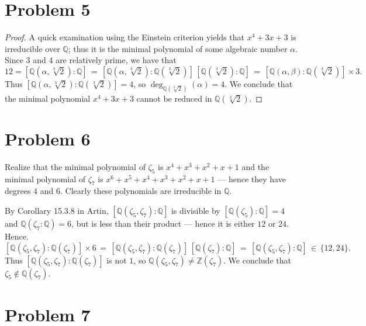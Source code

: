 \documentclass[11pt]{article}
\begin{document}
\section{Problem 5}

\begin{proof}
  A quick examination using the Einstein criterion yields that $x^{4} + 3x + 3$ is irreducible over $\mathbb{Q}$; thus it is the minimal polynomial of some algebraic number $\alpha$. Since $3$ and $4$ are relatively prime, we have that
  \[
    12 = [\mathbb{Q}(\alpha, \sqrt[3]{2}) : \mathbb{Q}] \, = \, [\mathbb{Q}(\alpha, \sqrt[3]{2}) : \mathbb{Q}(\sqrt[3]{2})] \, [\mathbb{Q}(\sqrt[3]{2}) : \mathbb{Q}] \, = \, [\mathbb{Q}(\alpha, \beta) : \mathbb{Q}(\sqrt[3]{2})] \times 3.
  \]
  Thus $[\mathbb{Q}(\alpha, \sqrt[3]{2}) : \mathbb{Q}(\sqrt[3]{2})] = 4$, so $\deg_{\mathbb{Q}(\sqrt[3]{2})} (\alpha) = 4$. We conclude that the minimal polynomial $x^{4} + 3x + 3$ cannot be reduced in $\mathbb{Q}(\sqrt[3]{2})$.
\end{proof}



\section{Problem 6}

Realize that the minimal polynomial of $\zeta_{5}$ is $x^{4} + x^{3} + x^{2} + x + 1$ and the minimal polynomial of $\zeta_{7}$ is $x^{6} + x^{5} + x^{4} + x^{3} + x^{2} + x + 1$ --- hence they have degrees $4$ and $6$. Clearly these polynomials are irreducible in $\mathbb{Q}$.

By Corollary 15.3.8 in Artin, $[\mathbb{Q}(\zeta_{5}, \zeta_{7}) : \mathbb{Q}]$ is divisible by $[\mathbb{Q}(\zeta_{5}) : \mathbb{Q}] = 4$ and $\mathbb{Q}(\zeta_{7} : \mathbb{Q}) = 6$, but is less than their product --- hence it is either $12$ or $24$. Hence.
\[
  [\mathbb{Q}(\zeta_{5}, \zeta_{7}) : \mathbb{Q}(\zeta_{7})] \times 6 \, = \, [\mathbb{Q}(\zeta_{5}, \zeta_{7}) : \mathbb{Q}(\zeta_{7})] \, [\mathbb{Q}(\zeta_{7}) : \mathbb{Q}] \, = \, [\mathbb{Q}(\zeta_{5}, \zeta_{7}) : \mathbb{Q}] \, \in \, \{ 12, 24 \}.
\]
Thus $[\mathbb{Q}(\zeta_{5}, \zeta_{7}) : \mathbb{Q}(\zeta_{7})]$ is not $1$, so $\mathbb{Q}(\zeta_{5}, \zeta_{7}) \ne \mathbb{Z}(\zeta_{7})$. We conclude that $\zeta_{5} \notin \mathbb{Q}(\zeta_{7})$.


\section{Problem 7}
\end{document}

